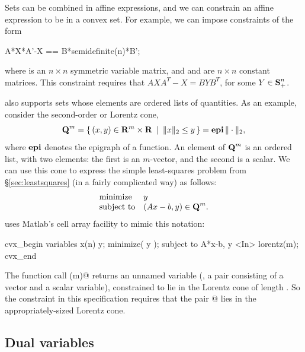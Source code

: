 \documentclass[12pt]{article}
\newcommand{\symm}{{\mbox{\bf S}}}  %
\newcommand{\lorentz}{{\mbox{\bf Q}}}  %
\begin{document}
Sets can be combined in affine expressions, and we can constrain
an affine expression to be in a convex set.
For example, we can impose constraints of the form
\begin{code}
	A*X*A'-X == B*semidefinite(n)*B';
\end{code}
where \verb@X@ is an $n \times n$ symmetric variable matrix,
and \verb@A@ and \verb@B@ are $n \times n$  constant matrices.
This constraint requires that $AXA^T-X=BYB^T$, 
for some $Y \in \symm^n_+$.

\cvx also supports sets whose elements are ordered
lists of quantities.  As an example, consider the second-order or 
Lorentz cone,
\begin{equation}
	\lorentz^m = \Condset{ (x,y) \in \R^m\times\R }{ \| x \|_2 \leq y } = \epi \|\cdot\|_2,
\end{equation}
where $\operatorname{\textbf{epi}}$ denotes the epigraph of a function.
An element of $\lorentz^m$ is an ordered list, with two elements:
the first is an $m$-vector, and the second is a scalar.
We can use this cone to express the simple least-squares problem 
from \S\ref{sec:leastsquares} (in a fairly complicated way)
as follows:
\begin{equation}
	\begin{array}{ll}
		\text{minimize}   & y \\
		\text{subject to} & ( A x - b, y ) \in \lorentz^m.
	\end{array}
\end{equation}
\cvx uses Matlab's cell array facility to mimic this notation:
\begin{code}
	cvx_begin
	    variables x(n) y;
	    minimize( y );
	    subject to
	        { A*x-b, y } <In> lorentz(m);
	cvx_end
\end{code}
The function call \verb@lorentz(m)@ returns
an unnamed variable (\ie, a pair consisting of a vector and a 
scalar variable),
constrained to lie in the Lorentz cone of length \verb@m@. 
So the constraint in this
specification requires that the pair @
lies in the appropriately-sized Lorentz cone.

\subsection{Dual variables}
\end{document}
